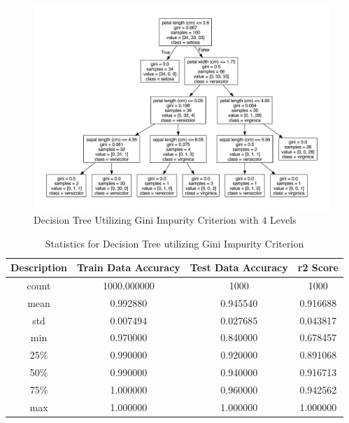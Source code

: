\documentclass[journal]{IEEEtran}
\begin{document}
\begin{figure}[h!]
\includegraphics[scale=.25]{iris-gini-4levels.pdf}
\centering
\caption{Decision Tree Utilizing Gini Impurity Criterion with 4 Levels}
\end{figure}

\begin{table}[h!]
\centering
\begin{tabular}{ c | c c c }
    Description & Train Data Accuracy & Test Data Accuracy & r2 Score \\ 
\hline
count     &     1000.000000     &    1000 & 1000\\
mean      &        0.992880     &       0.945540  &   0.916688\\
std       &        0.007494     &       0.027685  &   0.043817\\
min       &        0.970000     &       0.840000  &   0.678457\\
25\%      &         0.990000    &        0.920000 &    0.891068\\
50\%      &         0.990000    &        0.940000 &    0.916713\\
75\%      &         1.000000    &        0.960000 &    0.942562\\
max       &        1.000000     &       1.000000  &   1.000000
\end{tabular}
\caption{Statistics for Decision Tree utilizing Gini Impurity Criterion}
\end{table}
\end{document}
